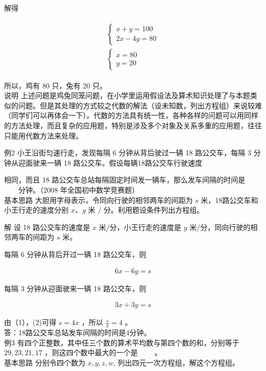 \documentclass[10pt]{article}
\begin{document}
解得

\begin{align*}
\begin{gathered}
\left\{\begin{array}{l}
x+y=100 \\
2 x-4 y=80
\end{array}\right. \\
\left\{\begin{array}{l}
x=80 \\
y=20
\end{array}\right.
\end{gathered}
\end{align*}

所以，鸡有 80 只，兔有 20 只。\\
说明 上述问题是鸡兔同笼问题，在小学里运用假设法及算术知识处理了与本题类似的问题。但是其处理的方式较之代数的解法（设未知数，列出方程组）来说较难（同学们可以再体会一下）。代数的方法具有统一性，各种各样的问题可以用同样的方法处理，而且复杂的应用题，特别是涉及多个对象及关系多重的应用题，往往只能用代数方法来处理。

例2 小王沿街匀速行走，发现每隔 6 分钟从背后驶过一辆 18 路公交车，每隔 3 分钟从迎面驶来一辆 18 路公交车。假设每辆18路公交车行驶速度

相同，而且 18 路公交车总站每隔固定时间发一辆车，那么发车间隔的时间是\\
$\qquad$分钟。（2008 年全国初中数学竞赛题）\\
基本思路 大胆用字母表示，令同向行驶的相邻两车的间距为 $s$ 米，18路公交车和小王行走的速度分别 $x 、 y$ 米 / 分。利用题设条件列出方程组。

解 设 18 路公交车的速度是 $x$ 米/分，小王行走的速度是 $y$ 米/分，同向行驶的相邻两车的间距为 $s$ 米。

每隔 6 分钟从背后开过一辆 18 路公交车，则

\begin{align*}
6 x-6 y=s \tag{1}
\end{align*}

每隔 3 分钟从迎面驶来一辆 18 路公交车，则

\begin{align*}
3 x+3 y=s \tag{2}
\end{align*}

由（1），(2)可得 $s=4 x$ ，所以 $\frac{s}{x}=4$ 。\\
答：18路公交车总站发车间隔的时间是4分钟。\\
例3 有四个正整数，其中任三个数的算术平均数与第四个数的和，分别等于 $29,23,21,17$ ，则这四个数中最大的一个是 $\qquad$。\\
基本思路 分别令四个数为 $x, y, z, w$, 列出四元一次方程组，解这个方程组。
\end{document}
